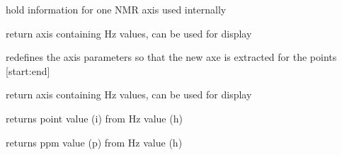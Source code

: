 \documentclass[letterpaper,10pt,openany,oneside]{sphinxmanual}
\begin{document}
\begin{fulllineitems}
\label{rst/code:NPKData.NMRAxis}
hold information for one NMR axis
used internally

\begin{fulllineitems}
\label{rst/code:NPKData.NMRAxis.Hz_axis}
return axis containing Hz values, can be used for display

\end{fulllineitems}


\begin{fulllineitems}
\label{rst/code:NPKData.NMRAxis.extract}
redefines the axis parameters so that the new axe is extracted for the points {[}start:end{]}

\end{fulllineitems}


\begin{fulllineitems}
\label{rst/code:NPKData.NMRAxis.freq_axis}
return axis containing Hz values, can be used for display

\end{fulllineitems}


\begin{fulllineitems}
\label{rst/code:NPKData.NMRAxis.htoi}
returns point value (i) from Hz value (h)

\end{fulllineitems}


\begin{fulllineitems}
\label{rst/code:NPKData.NMRAxis.htop}
returns ppm value (p) from Hz value (h)

\end{fulllineitems}


\end{fulllineitems}
\end{document}
